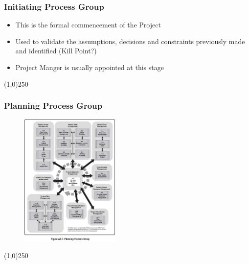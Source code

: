 \begin{frame}
\frametitle{Initiating Process Group}
\begin{itemize}
	\item This is the formal commencement of the Project
	\item Used to validate the assumptions, decisions and constraints previously made and identified (Kill Point?)
	\item Project Manger is usually appointed at this stage
\end{itemize}
\end{frame}
\begin{center}\line(1,0){250}\end{center}




\begin{frame}
\frametitle{Planning Process Group}
 \begin{figure}
 	\centering
 		\includegraphics[width = 5cm]{images/FigA1-7.jpg}
 	\label{fig:A1-7}
 \end{figure}
\end{frame}
\begin{center}\line(1,0){250}\end{center}



